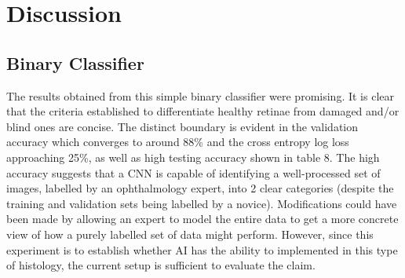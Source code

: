 \documentclass[a4paper]{article}
\begin{document}
\section{Discussion}
    \subsection{Binary Classifier}
    The results obtained from this simple binary classifier were promising. It is clear that the criteria established to differentiate healthy retinae from damaged and/or blind ones are concise. The distinct boundary is evident in the validation accuracy which converges to around 88\% and the cross entropy log loss approaching 25\%, as well as high testing accuracy shown in table 8. The high accuracy suggests that a CNN is capable of identifying a well-processed set of images, labelled by an ophthalmology expert, into 2 clear categories (despite the training and validation sets being labelled by a novice). Modifications could have been made by allowing an expert to model the entire data to get a more concrete view of how a purely labelled set of data might perform. However, since this experiment is to establish whether AI has the ability to implemented in this type of histology, the current setup is sufficient to evaluate the claim.   
    \vspace{3mm}
\end{document}
